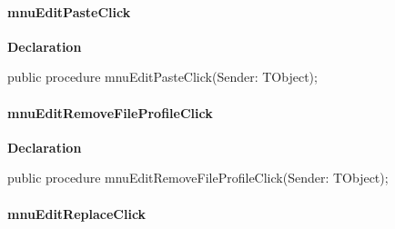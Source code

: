 \documentclass{report}
\newif\ifpdf
\begin{document}
\paragraph*{mnuEditPasteClick}\hspace*{\fill}

\label{editor.TFrmEditor-mnuEditPasteClick}
\begin{list}{}{
\setlength{\itemindent}{0cm}
\setlength{\listparindent}{0cm}
\setlength{\leftmargin}{\evensidemargin}
\addtolength{\leftmargin}{\tmplength}
\settowidth{\labelsep}{X}
\addtolength{\leftmargin}{\labelsep}
\setlength{\labelwidth}{\tmplength}
}
\item[\textbf{Declaration}\hfill]
\ifpdf
\begin{flushleft}
\fi
\begin{ttfamily}
public procedure mnuEditPasteClick(Sender: TObject);\end{ttfamily}

\ifpdf
\end{flushleft}
\fi

\end{list}
\paragraph*{mnuEditRemoveFileProfileClick}\hspace*{\fill}

\label{editor.TFrmEditor-mnuEditRemoveFileProfileClick}
\begin{list}{}{
\setlength{\itemindent}{0cm}
\setlength{\listparindent}{0cm}
\setlength{\leftmargin}{\evensidemargin}
\addtolength{\leftmargin}{\tmplength}
\settowidth{\labelsep}{X}
\addtolength{\leftmargin}{\labelsep}
\setlength{\labelwidth}{\tmplength}
}
\item[\textbf{Declaration}\hfill]
\ifpdf
\begin{flushleft}
\fi
\begin{ttfamily}
public procedure mnuEditRemoveFileProfileClick(Sender: TObject);\end{ttfamily}

\ifpdf
\end{flushleft}
\fi

\end{list}
\paragraph*{mnuEditReplaceClick}\hspace*{\fill}
\end{document}
